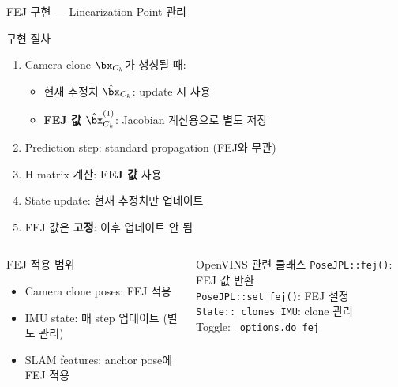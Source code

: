 \begin{frame}[shrink=10]{FEJ 구현 --- Linearization Point 관리}
  \begin{block}{구현 절차}
    \begin{enumerate}
      \item Camera clone $\bx_{C_k}$가 생성될 때:
        \begin{itemize}
          \item 현재 추정치 $\hat{\bx}_{C_k}$: update 시 사용
          \item \textbf{FEJ 값} $\hat{\bx}_{C_k}^{(1)}$: Jacobian 계산용으로 별도 저장
        \end{itemize}
      \item Prediction step: standard propagation (FEJ와 무관)
      \item H matrix 계산: \textbf{FEJ 값} 사용
      \item State update: 현재 추정치만 업데이트
      \item FEJ 값은 \textbf{고정}: 이후 업데이트 안 됨
    \end{enumerate}
  \end{block}
  \begin{columns}[T]
      \begin{alertblock}{FEJ 적용 범위}
        \begin{itemize}
          \item Camera clone poses: FEJ 적용
          \item IMU state: 매 step 업데이트 (별도 관리)
          \item SLAM features: anchor pose에 FEJ 적용
        \end{itemize}
      \end{alertblock}
      \begin{exampleblock}{OpenVINS 관련 클래스}
        \texttt{PoseJPL::fej()}: FEJ 값 반환\\
        \texttt{PoseJPL::set\_fej()}: FEJ 설정\\
        \texttt{State::\_clones\_IMU}: clone 관리\\
        Toggle: \texttt{\_options.do\_fej}
      \end{exampleblock}
  \end{columns}
\end{frame}


